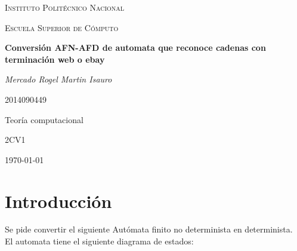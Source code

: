 \documentclass[spanish]{article}
\begin{document}
\begin{titlepage}

\centering
	\vspace{1cm}
	{\scshape\LARGE Instituto Politécnico Nacional \par}
	\vspace{0.7cm}
	{\scshape\Large Escuela Superior de Cómputo\par}
	\vspace{1.5cm}
	{\huge\bfseries Conversión AFN-AFD de automata que reconoce cadenas con terminación web o ebay\par}
	\vspace{2cm}
	{\Large\itshape Mercado Rogel Martin Isauro\par}
	\vspace{0.7cm}
	{\large 2014090449\par}
	\vspace{0.7cm}
	{\large Teoría computacional\par}
	\vspace{0.7cm}
	{\large 2CV1\par}
	\vfill

	\vfill

	{\large \today\par}
\end{titlepage}
\section{Introducción}
Se pide convertir  el siguiente Autómata finito no determinista en determinista.\\
El automata tiene el siguiente diagrama de estados:\\
\end{document}
